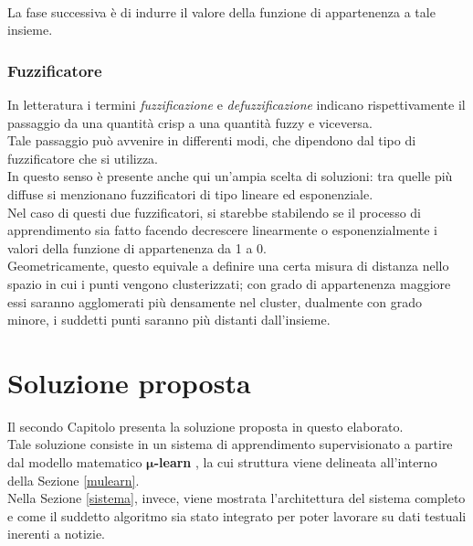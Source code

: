 \documentclass[12pt]{report}
\theoremstyle{definition}
\begin{document}
\\
La fase successiva è di indurre il valore della funzione di appartenenza a tale insieme.

\subsection{Fuzzificatore} \label{fuzzificatore}
In letteratura i termini \textit{fuzzificazione} e \textit{defuzzificazione} indicano rispettivamente il passaggio da una quantità crisp a una quantità fuzzy e viceversa.
\\
Tale passaggio può avvenire in differenti modi, che dipendono dal tipo di fuzzificatore che si utilizza.
\\
In questo senso è presente anche qui un'ampia scelta di soluzioni: tra quelle più diffuse si menzionano fuzzificatori di tipo lineare ed esponenziale.
\\
Nel caso di questi due fuzzificatori, si starebbe stabilendo se il processo di apprendimento sia fatto facendo decrescere linearmente o esponenzialmente i valori della funzione di appartenenza da 1 a 0.
\\
Geometricamente, questo equivale a definire una certa misura di distanza nello spazio in cui i punti vengono clusterizzati; con grado di appartenenza maggiore essi saranno agglomerati più densamente nel cluster, dualmente con grado minore, i suddetti punti saranno più distanti dall'insieme.

\chapter{Soluzione proposta}
\label{Capitolo 2}
\onehalfspacing
Il secondo Capitolo presenta la soluzione proposta in questo elaborato.
\\
Tale soluzione consiste in un sistema di apprendimento supervisionato a partire dal modello matematico $\bm{\mu}$\textbf{-learn} \cite{1}, la cui struttura viene delineata all'interno della Sezione \ref{mulearn}.
\\
Nella Sezione \ref{sistema}, invece, viene mostrata l'architettura del sistema completo e come il suddetto algoritmo sia stato integrato per poter lavorare su dati testuali inerenti a notizie.
\end{document}
